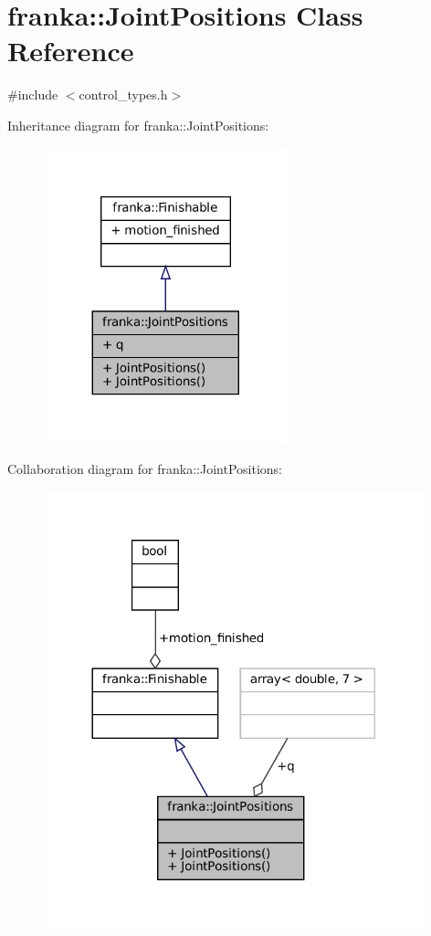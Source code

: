 \hypertarget{classfranka_1_1JointPositions}{}\section{franka\+:\+:Joint\+Positions Class Reference}
\label{classfranka_1_1JointPositions}


{\ttfamily \#include $<$control\+\_\+types.\+h$>$}



Inheritance diagram for franka\+:\+:Joint\+Positions\+:
\nopagebreak
\begin{figure}[H]
\begin{center}
\leavevmode
\includegraphics[width=200pt]{classfranka_1_1JointPositions__inherit__graph}
\end{center}
\end{figure}


Collaboration diagram for franka\+:\+:Joint\+Positions\+:
\nopagebreak
\begin{figure}[H]
\begin{center}
\leavevmode
\includegraphics[width=312pt]{classfranka_1_1JointPositions__coll__graph}
\end{center}
\end{figure}
